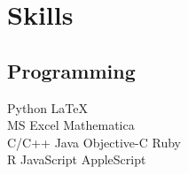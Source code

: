 \documentclass[letterpaper]{deedy-resume} %
\begin{document}
\begin{minipage}[t]{0.39\textwidth}



\section{Skills}

\subsection{Programming}

Python \textbullet{} \LaTeX \\
MS Excel \textbullet{} Mathematica\\
C/C++ \textbullet{} Java \textbullet{} Objective-C \textbullet{} Ruby\\
R \textbullet{} JavaScript \textbullet{} AppleScript\\


\sectionspace %






\end{minipage}
\end{document}
